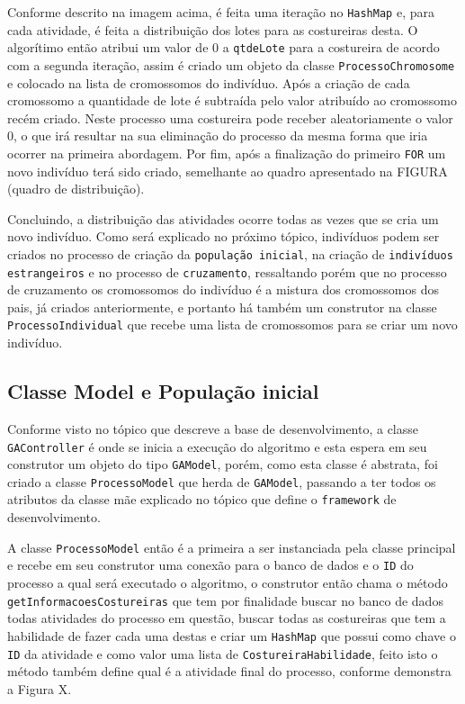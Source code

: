 \newpage
 
\par Conforme descrito na imagem acima, é feita uma iteração no \texttt{HashMap} e, para cada atividade, é feita a distribuição 
dos lotes para as costureiras desta. O algorítimo então atribui um valor de 0 a \texttt{qtdeLote} para a costureira de acordo 
com a segunda iteração, assim é criado um objeto da classe \texttt{ProcessoChromosome} e colocado na lista de cromossomos do 
indivíduo. Após a criação de cada cromossomo a quantidade de lote é subtraída pelo valor atribuído ao cromossomo recém criado.
Neste processo uma costureira pode receber aleatoriamente o valor 0, o que irá resultar na sua eliminação do processo da mesma forma
que iria ocorrer na primeira abordagem. Por fim, após a finalização do primeiro \texttt{FOR} um novo indivíduo terá sido criado, 
semelhante ao quadro apresentado na FIGURA (quadro de distribuição).

\par Concluindo, a distribuição das atividades ocorre todas as vezes que se cria um novo indivíduo.
Como será explicado no próximo tópico, indivíduos podem ser criados no processo de criação da \texttt{população inicial}, 
na criação de \texttt{indivíduos estrangeiros} e no processo de \texttt{cruzamento}, ressaltando porém que no processo 
de cruzamento os cromossomos do indivíduo é a mistura dos cromossomos dos pais, já criados anteriormente, e portanto 
há também um construtor na classe \texttt{ProcessoIndividual} que recebe uma lista de cromossomos para se criar um novo indivíduo.

\subsection {Classe Model e População inicial}
\par Conforme visto no tópico que descreve a base de desenvolvimento, a classe \texttt{GAController} é onde se inicia 
a execução do algoritmo e esta espera em seu construtor um objeto do tipo \texttt{GAModel}, porém, como esta classe é 
abstrata, foi criado a classe \texttt{ProcessoModel} que herda de \texttt{GAModel}, passando a ter todos os atributos
da classe mãe explicado no tópico que define o \texttt{framework} de desenvolvimento.
\par A classe \texttt{ProcessoModel} então é a primeira a ser instanciada pela classe principal e recebe em seu construtor
uma conexão para o banco de dados e o \texttt{ID} do processo a qual será executado o algoritmo, o construtor então chama
o método \texttt{getInformacoesCostureiras} que tem por finalidade buscar no banco de dados todas atividades do processo em questão,
buscar todas as costureiras que tem a habilidade de fazer cada uma destas e criar um \texttt{HashMap} 
que possui como chave o \texttt{ID} da atividade e como valor uma lista de \texttt{CostureiraHabilidade}, feito isto o método 
também define qual é a atividade final do processo, conforme demonstra a Figura X.


